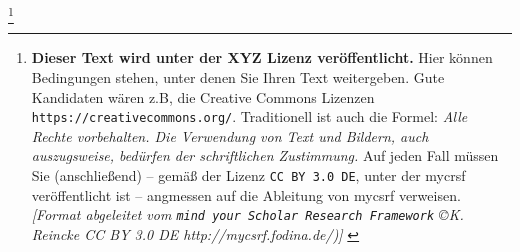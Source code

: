 %
%
%

\footnote{\textbf{Dieser Text wird unter der XYZ Lizenz veröffentlicht.}
Hier können Bedingungen stehen, unter denen Sie Ihren Text weitergeben.
Gute Kandidaten wären z.B, die Creative Commons Lizenzen
\texttt{https://creativecommons.org/}. Traditionell ist auch die Formel:
\emph{Alle Rechte vorbehalten. Die Verwendung von Text und Bildern, auch
auszugsweise, bedürfen der schriftlichen Zustimmung.} Auf jeden Fall müssen Sie
(anschließend) -- gemäß der Lizenz \texttt{CC BY 3.0 DE}, unter der mycrsf
veröffentlicht ist -- angmessen auf die Ableitung von mycsrf verweisen.
\newline 
{ \tiny \itshape [Format abgeleitet vom \texttt{mind your Scholar Research
Framework} \copyright K. Reincke CC BY 3.0 DE http://mycsrf.fodina.de/)] }}

